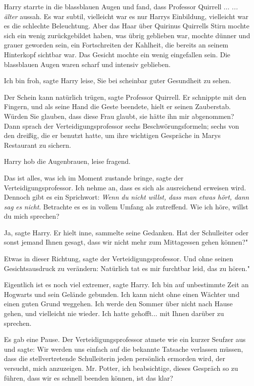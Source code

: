 Harry starrte in die blassblauen Augen und fand, dass Professor Quirrell ...
\emph{... älter} aussah. Es war subtil, vielleicht war es nur Harrys Einbildung,
vielleicht war es die schlechte Beleuchtung. Aber das Haar über Quirinus
Quirrells Stirn mochte sich ein wenig zurückgebildet haben, was übrig geblieben
war, mochte dünner und grauer geworden sein, ein Fortschreiten der Kahlheit, die
bereits an seinem Hinterkopf sichtbar war. Das Gesicht mochte ein wenig
eingefallen sein. Die blassblauen Augen waren scharf und intensiv geblieben.

\glqq Ich bin froh\grqq{}, sagte Harry leise, \glqq Sie bei scheinbar guter
Gesundheit zu sehen.\grqq{}

\glqq Der Schein kann natürlich trügen\grqq{}, sagte Professor Quirrell. Er
schnippte mit den Fingern, und als seine Hand die Geste beendete, hielt er
seinen Zauberstab. \glqq Würden Sie glauben, dass diese Frau glaubt, sie hätte
ihn mir abgenommen?\grqq{} Dann sprach der Verteidigungsprofessor sechs
Beschwörungsformeln; sechs von den dreißig, die er benutzt hatte, um ihre
wichtigen Gespräche in Marys Restaurant zu sichern.

Harry hob die Augenbrauen, leise fragend.

\glqq Das ist alles, was ich im Moment zustande bringe\grqq{}, sagte der
Verteidigungsprofessor. \glqq Ich nehme an, dass es sich als ausreichend
erweisen wird. Dennoch gibt es ein Sprichwort: \emph{Wenn du nicht willst, dass
man etwas hört, dann sag es nicht}. Betrachte es es in vollem Umfang als
zutreffend. Wie ich höre, willst du mich sprechen?\grqq{}

\glqq Ja\grqq{}, sagte Harry. Er hielt inne, sammelte seine Gedanken. \glqq Hat
der Schulleiter oder sonst jemand Ihnen gesagt, dass wir nicht mehr zum
Mittagessen gehen können?"

\glqq Etwas in dieser Richtung\grqq{}, sagte der Verteidigungsprofessor. Und
ohne seinen Gesichtsausdruck zu verändern: \glqq Natürlich tat es mir furchtbar
leid, das zu hören."

\glqq Eigentlich ist es noch viel extremer\grqq{}, sagte Harry. \glqq Ich bin
auf unbestimmte Zeit an Hogwarts und sein Gelände gebunden. Ich kann nicht ohne
einen Wächter und einen guten Grund weggehen. Ich werde den Sommer über nicht
nach Hause gehen, und vielleicht nie wieder. Ich hatte gehofft... mit Ihnen
darüber zu sprechen.\grqq{}

Es gab eine Pause. Der Verteidigungsprofessor atmete wie ein kurzer Seufzer aus
und sagte: \glqq Wir werden uns einfach auf die bekannte Tatsache verlassen
müssen, dass die stellvertretende Schulleiterin jeden persönlich ermorden wird,
der versucht, mich anzuzeigen. Mr. Potter, ich beabsichtige, dieses Gespräch so
zu führen, dass wir es schnell beenden können, ist das klar?\grqq{}

